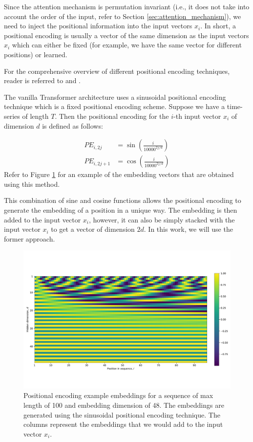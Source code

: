 \documentclass[a4paper, twoside]{report}
\theoremstyle{definition}
\numberwithin{equation}{section}
\begin{document}
Since the attention mechanism is permutation invariant
(i.e., it does not take into account the order of the input, refer to Section \ref{sec:attention_mechanism}),
we need to inject the positional information into the input vectors $x_i$.
In short, a positional encoding is usually a vector of the same dimension as the input vectors $x_i$
which can either be fixed (for example, we have the same vector for different positions) or learned.

For the comprehensive overview of different positional encoding techniques, reader
is referred to \cite{Dufter2021PositionII} and \cite{Weng_2023}.

The vanilla Transformer architecture uses a sinusoidal positional encoding technique
which is a fixed positional encoding scheme. Suppose we have a time-series of length $T$.
Then the positional encoding for the $i$-th input vector $x_i$ of dimension $d$ is defined as follows:

\begin{equation}
    \begin{array}{rll}
        PE_{i, 2j}   & = \sin(\frac{i}{10000^{2j/d}}) \\
        PE_{i, 2j+1} & = \cos(\frac{i}{10000^{2j/d}})
    \end{array}
\end{equation}
Refer to Figure \ref{fig:pos_encoding} for an example of the embedding vectors that
are obtained using this method.

This combination of sine and cosine functions allows the positional encoding to
generate the embedding of a position in a unique way. The embedding is then
added to the input vector $x_i$, however, it can also be simply stacked with the input vector $x_i$
to get a vector of dimension $2d$. In this work, we will use the former approach.

\begin{figure}[h]
    \centering
    \includegraphics[width=\textwidth]{etc/pos_encoding.pdf}
    \caption{Positional encoding example embeddings for a sequence of max length of 100 and embedding dimension of 48.
        The embeddings are generated using the sinusoidal positional encoding technique.
        The columns represent the embeddings that we would add to the input vector $x_i$.
    }
    \label{fig:pos_encoding}
\end{figure}
\end{document}

